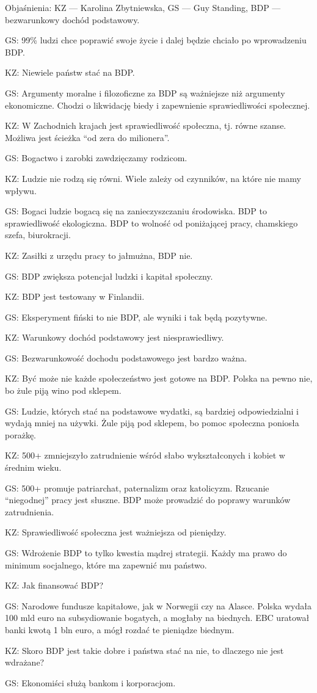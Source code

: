 \documentclass[11pt]{article}
\begin{document}
	\par Objaśnienia: KZ — Karolina Zbytniewska, GS — Guy Standing, BDP — bezwarunkowy dochód podstawowy.
	\par GS: 99\% ludzi chce poprawić swoje życie i dalej będzie chciało po wprowadzeniu BDP.
	\par KZ: Niewiele państw stać na BDP.
	\par GS: Argumenty moralne i filozoficzne za BDP są ważniejsze niż argumenty ekonomiczne. Chodzi o likwidację biedy i zapewnienie sprawiedliwości społecznej.
	\par KZ: W Zachodnich krajach jest sprawiedliwość społeczna, tj. równe szanse. Możliwa jest ścieżka ``od zera do milionera''.
	\par GS: Bogactwo i zarobki zawdzięczamy rodzicom.
	\par KZ: Ludzie nie rodzą się równi. Wiele zależy od czynników, na które nie mamy wpływu.
	\par GS: Bogaci ludzie bogacą się na zanieczyszczaniu środowiska. BDP to sprawiedliwość ekologiczna. BDP to wolność od poniżającej pracy, chamskiego szefa, biurokracji.
	\par KZ: Zasiłki z urzędu pracy to jałmużna, BDP nie.
	\par GS: BDP zwiększa potencjał ludzki i kapitał społeczny.
	\par KZ: BDP jest testowany w Finlandii.
	\par GS: Eksperyment fiński to nie BDP, ale wyniki i tak będą pozytywne.
	\par KZ: Warunkowy dochód podstawowy jest niesprawiedliwy.
	\par GS: Bezwarunkowość dochodu podstawowego jest bardzo ważna.
	\par KZ: Być może nie każde społeczeństwo jest gotowe na BDP. Polska na pewno nie, bo żule piją wino pod sklepem.
	\par GS: Ludzie, których stać na podstawowe wydatki, są bardziej odpowiedzialni i wydają mniej na używki. Żule piją pod sklepem, bo pomoc społeczna poniosła porażkę.
	\par KZ: 500+ zmniejszyło zatrudnienie wśród słabo wykształconych i kobiet w średnim wieku.
	\par GS: 500+ promuje patriarchat, paternalizm oraz katolicyzm. Rzucanie ``niegodnej'' pracy jest słuszne. BDP może prowadzić do poprawy warunków zatrudnienia.
	\par KZ: Sprawiedliwość społeczna jest ważniejsza od pieniędzy.
	\par GS: Wdrożenie BDP to tylko kwestia mądrej strategii. Każdy ma prawo do minimum socjalnego, które ma zapewnić mu państwo.
	\par KZ: Jak finansować BDP?
	\par GS: Narodowe fundusze kapitałowe, jak w Norwegii czy na Alasce. Polska wydała 100 mld euro na subsydiowanie bogatych, a mogłaby na biednych. EBC uratował banki kwotą 1 bln euro, a mógł rozdać te pieniądze biednym.
	\par KZ: Skoro BDP jest takie dobre i państwa stać na nie, to dlaczego nie jest wdrażane?
	\par GS: Ekonomiści służą bankom i korporacjom. \\
	
\end{document}
